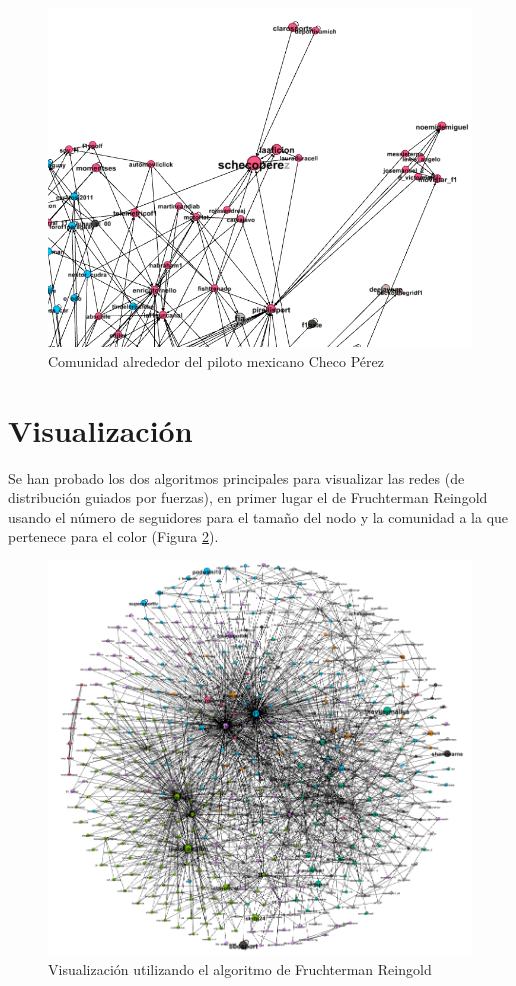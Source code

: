 \begin{figure}[H]
	\centering
	\includegraphics[width=14cm]{img/comunidad-perez}
	\caption{Comunidad alrededor del piloto mexicano Checo Pérez}
	\label{fig:comunidad-perez}
\end{figure}

\section{Visualización}

Se han probado los dos algoritmos principales para visualizar las redes (de distribución guiados por fuerzas), en primer lugar el de Fruchterman Reingold usando el número de seguidores para el tamaño del nodo y la comunidad a la que pertenece para el color (Figura \ref{fig:fruchterman-reingold}).

\begin{figure}[H]
	\centering
	\includegraphics[width=14cm]{img/fruchterman-reingold}
	\caption{Visualización utilizando el algoritmo de Fruchterman Reingold}
	\label{fig:fruchterman-reingold}
\end{figure}

